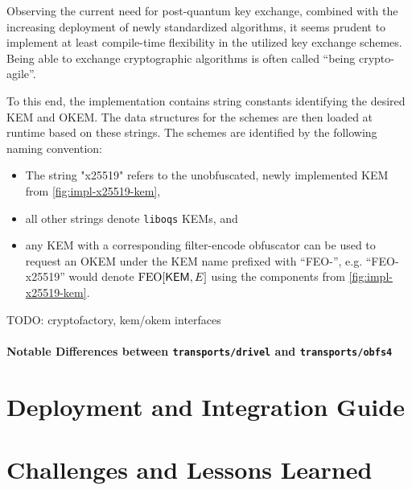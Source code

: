 Observing the current need for post-quantum key exchange, combined with the increasing deployment of newly standardized algorithms, it seems prudent to implement at least compile-time flexibility in the utilized key exchange schemes. Being able to exchange cryptographic algorithms is often called ``being crypto-agile''.

To this end, the \drivel{} implementation contains string constants identifying the desired KEM and OKEM. The data structures for the schemes are then loaded at runtime based on these strings.
The schemes are identified by the following naming convention:
\begin{itemize}
    \item The string "x25519" refers to the unobfuscated, newly implemented KEM from \cref{fig:impl-x25519-kem},
    \item all other strings denote \texttt{liboqs} KEMs, and
    \item any KEM with a corresponding filter-encode obfuscator can be used to request an OKEM under the KEM name prefixed with ``FEO-'', e.g. ``FEO-x25519'' would denote $\textsf{\textnormal{FEO}}[\mathsf{KEM}, E]$ using the components from \cref{fig:impl-x25519-kem}.
\end{itemize}

TODO: cryptofactory, kem/okem interfaces

\paragraph{Notable Differences between \texttt{transports/drivel} and \texttt{transports/obfs4}}

\section{Deployment and Integration Guide} \label{sec:deployment}

\section{Challenges and Lessons Learned} \label{sec:challenges-learnings}

